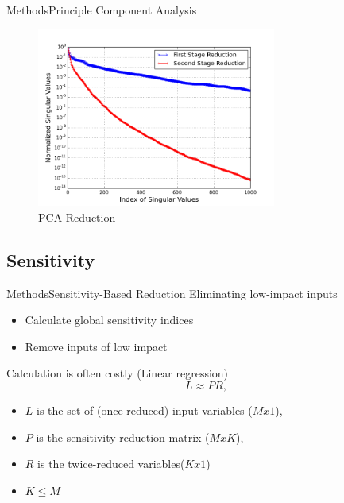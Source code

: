 \documentclass{beamer}
\begin{document}
\begin{frame}{Methods}{Principle Component Analysis}%
  \begin{figure}[h!]
    \centering
      \includegraphics[width=0.7\textwidth]{graphics/PCA_1_2}
      \caption{PCA Reduction}
  \end{figure}
\end{frame}

\subsection{Sensitivity}
\begin{frame}{Methods}{Sensitivity-Based Reduction}%
  Eliminating low-impact inputs
  \begin{itemize}
    \item Calculate global sensitivity indices
    \item Remove inputs of low impact
  \end{itemize}
  \vspace{10pt}
  Calculation is often costly (Linear regression)
  \begin{equation}
    L \approx P R, \nonumber
  \end{equation}
  \begin{itemize}
    \item $L$ is the set of (once-reduced) input variables ($Mx1$),
    \item $P$ is the sensitivity reduction matrix ($MxK$),
    \item $R$ is the twice-reduced variables($Kx1$)
    \item $K \leq M$
  \end{itemize}
\end{frame}
\end{document}

